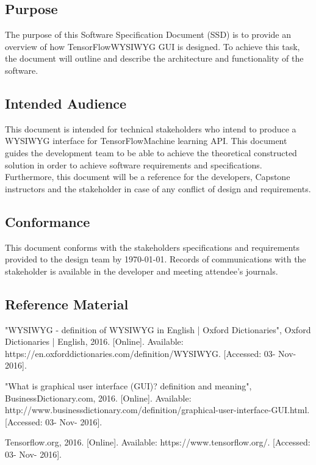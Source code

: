 \documentclass[journal,10pt,onecolumn,compsoc]{IEEEtran} \usepackage[margin=1.0in]{geometry} \usepackage{pdfpages}
\begin{document}
\subsection{Purpose}
The purpose of this Software Specification Document (SSD) is to provide an overview of how TensorFlow\texttrademark WYSIWYG GUI is designed.\cite{ieee}
To achieve this task, the document will outline and describe the architecture and functionality of the software.
\subsection{Intended Audience}
\noindent This document is intended for technical stakeholders who intend to produce a WYSIWYG interface for TensorFlow\texttrademark Machine learning API. 
This document guides the development team to be able to achieve the theoretical constructed solution in order to achieve software requirements and specifications. 
Furthermore, this document will be a reference for the developers, Capstone instructors and the stakeholder in case of any conflict of design and requirements.
\subsection{Conformance}
\noindent This document conforms with the stakeholders specifications and requirements provided to the design team by \today. Records of communications with the stakeholder is available in the developer and meeting attendee's journals.
\subsection{Reference Material}

\noindent [1]"WYSIWYG - definition of WYSIWYG in English | Oxford Dictionaries", Oxford Dictionaries | English, 2016. [Online]. Available: https://en.oxforddictionaries.com/definition/WYSIWYG. [Accessed: 03- Nov- 2016].

\noindent [2]"What is graphical user interface (GUI)? definition and meaning", BusinessDictionary.com, 2016. [Online]. Available: http://www.businessdictionary.com/definition/graphical-user-interface-GUI.html. [Accessed: 03- Nov- 2016].

\noindent [3]Tensorflow.org, 2016. [Online]. Available: https://www.tensorflow.org/. [Accessed: 03- Nov- 2016]. 
\end{document}

